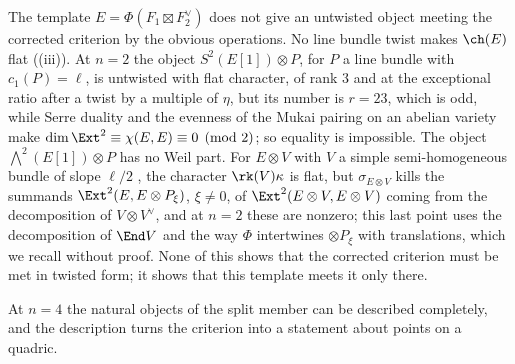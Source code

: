 \begin{remark}[Untwisting]\label{rem:untwisting}
The template $E=\Phi(F_{1}\boxtimes F_{2}^{\vee})$ does not give an untwisted
object meeting the corrected criterion by the obvious operations. No line
bundle twist makes $\ch(E)$ flat ((iii)). At $n=2$ the
object $S^{2}(E[1])\otimes P$, for $P$ a line bundle with $c_{1}(P)=\ell$, is
untwisted with flat character, of rank $3$ and at the exceptional ratio after
a twist by a multiple of $\eta$, but its number is $r=23$, which is odd, while
Serre duality and the evenness of the Mukai pairing on an abelian variety make
$\dim\Ext^{2}\equiv\chi(E,E)\equiv0\pmod2$; so equality is impossible. The
object $\bigwedge^{2}(E[1])\otimes P$ has no Weil part. For $E\otimes V$ with $V$ a
simple semi-homogeneous bundle of slope $\ell/2$ \cite{Muk78}, the character
$\rk(V)\kappa$ is flat, but $\sigma_{E\otimes V}$ kills the summands
$\Ext^{2}(E,E\otimes P_{\xi})$, $\xi\ne0$, of $\Ext^{2}(E\otimes V,E\otimes V)$
coming from the decomposition of $V\otimes V^{\vee}$, and at $n=2$ these are
nonzero; this last point uses the decomposition of $\End V$ and the way
$\Phi$ intertwines $\otimes P_{\xi}$ with translations, which we recall
without proof. None of this shows that the corrected criterion must be met in
twisted form; it shows that this template meets it only there.
\end{remark}

At $n=4$ the natural objects of the split member can be described completely,
and the description turns the criterion into a statement about points on a
quadric.

